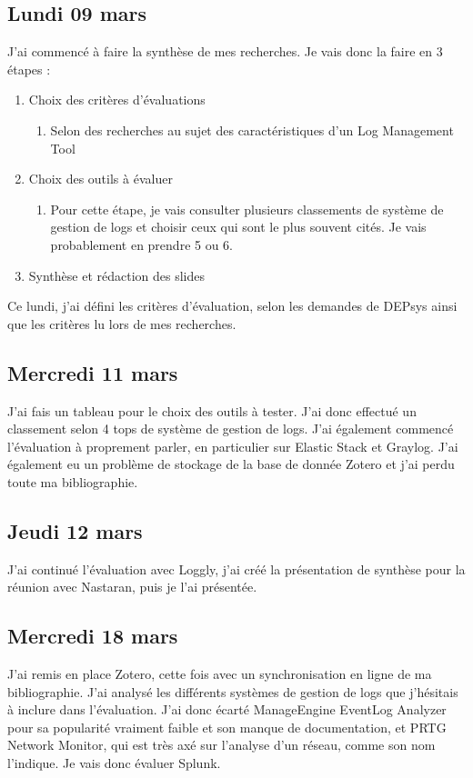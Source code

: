 \documentclass[paper=a4, fontsize=11pt]{scrartcl}
\begin{document}
\subsection{Lundi 09 mars}
    J'ai commencé à faire la synthèse de mes recherches. Je vais donc la faire en 3 étapes :
    \begin{enumerate}
    \item Choix des critères d'évaluations
        \begin{enumerate}
            \item Selon des recherches au sujet des caractéristiques d'un \og Log Management Tool \fg
        \end{enumerate}
    \item Choix des outils à évaluer
        \begin{enumerate}
                \item Pour cette étape, je vais consulter plusieurs classements de système de gestion de logs et choisir ceux qui sont le plus souvent cités. Je vais probablement en prendre 5 ou 6.
        \end{enumerate}
    \item Synthèse et rédaction des slides
    \end{enumerate}
    Ce lundi, j'ai défini les critères d'évaluation, selon les demandes de DEPsys ainsi que les critères lu lors de mes recherches.
\subsection{Mercredi 11 mars}
    J'ai fais un tableau pour le choix des outils à tester. J'ai donc effectué un classement selon 4 tops de système de gestion de logs.
    J'ai également commencé l'évaluation à proprement parler, en particulier sur Elastic Stack et Graylog. J'ai également eu un problème de stockage de la base de donnée Zotero et j'ai perdu toute ma bibliographie.
\subsection{Jeudi 12 mars}
    J'ai continué l'évaluation avec Loggly, j'ai créé la présentation de synthèse pour la réunion avec Nastaran, puis je l'ai présentée.
\subsection{Mercredi 18 mars}
    J'ai remis en place Zotero, cette fois avec un synchronisation en ligne de ma bibliographie. J'ai analysé les différents systèmes de gestion de logs que j'hésitais à inclure dans l'évaluation. J'ai donc écarté ManageEngine EventLog Analyzer pour sa popularité vraiment faible et son manque de documentation, et PRTG Network Monitor, qui est très axé sur l'analyse d'un réseau, comme son nom l'indique. Je vais donc évaluer Splunk.
\end{document}

